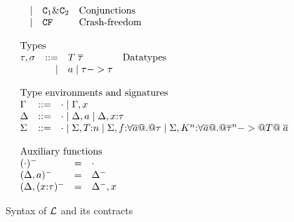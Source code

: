 \begin{figure}
\[\begin{array}{l}
\begin{array}{lrll}
     & \mid & \Ct_1 \& \Ct_2             & \text{Conjunctions}   \\ 
     & \mid & \CF                        & \text{Crash-freedom}   \\
\end{array}
\\ \\
\begin{array}{lrll}
\multicolumn{3}{l}{\text{Types}} \\
\tau,\sigma & ::=  & T\;\taus & \text{Datatypes} \\ 
            & \mid & a \mid \tau -> \tau 
\end{array}
\\ \\
\begin{array}{lrll}
\multicolumn{3}{l}{\text{Type environments and signatures}} \\
\Gamma & ::=  & \cdot \mid \Gamma,x \\
\Delta & ::=  & \cdot \mid \Delta,a \mid \Delta,x{:}\tau \\
\Sigma & ::=  & \cdot \mid \Sigma,T{:}n \mid \Sigma,f{:}\forall\ol{a} @.@ \tau \mid \Sigma,K^{\ar}{:}\forall\ol{a} @.@ \oln{\tau}{\ar} -> @T@\;\as
\end{array}
\\ \\
\begin{array}{lrll}
\multicolumn{3}{l}{\text{Auxiliary functions}} \\
(\cdot)^{-}            & = & \cdot \\
(\Delta,a)^{-}         & = & \Delta^{-} \\
(\Delta,(x{:}\tau)^{-} & = & \Delta^{-},x
\end{array}
\end{array}\] 
\caption{Syntax of $\cal L$ and its contracts}\label{fig:syntax}
\end{figure}

